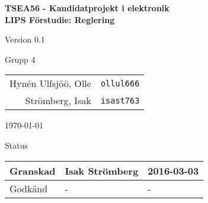 \documentclass[11pt]{article}
\begin{document}
\begin{titlepage}
\begin{center}

{\Large\bfseries TSEA56 - Kandidatprojekt i elektronik \\ LIPS Förstudie: Reglering}

\vspace{5em}

Version 0.1

\vspace{5em}
Grupp 4 \\
\begin{tabular}{rl}
Hynén Ulfsjöö, Olle&\verb+ollul666+
\\
Strömberg, Isak&\verb+isast763+
\\
\end{tabular}

\vspace{5em}
\today

\vspace{16em}
Status
\begin{longtable}{|l|l|l|} \hline

Granskad & Isak Strömberg & 2016-03-03 \\ \hline
Godkänd & - & - \\ \hline
 
\end{longtable}

\end{center}
\end{titlepage}
\end{document}
